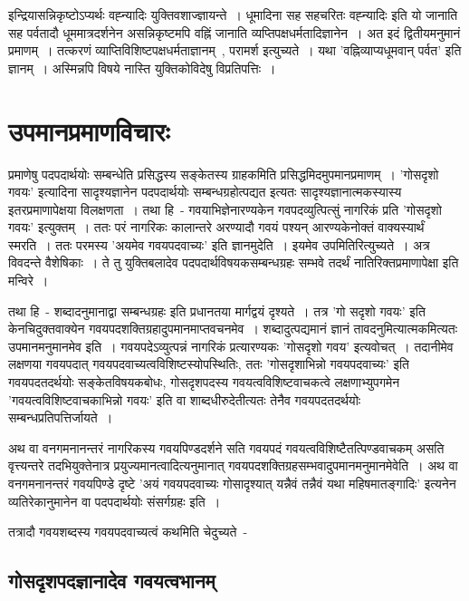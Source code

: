 इन्द्रियासन्निकृष्टोऽप्यर्थः वह्न्यादिः युक्तिवशाज्ज्ञायन्ते~। धूमादिना सह सहचरितः वह्न्यादिः इति यो जानाति सह पर्वतादौ धूममात्रदर्शनेन असन्निकृष्टमपि वह्निं जानाति व्यप्तिपक्षधर्मतादिज्ञानेन~। अत इदं द्वितीयमनुमानं प्रमाणम्~। तत्करणं व्याप्तिविशिष्टपक्षधर्मताज्ञानम्~, परामर्श इत्युच्यते~। यथा 'वह्निव्याप्यधूमवान् पर्वत' इति ज्ञानम्~। अस्मिन्नपि विषये नास्ति युक्तिकोविदेषु विप्रतिपत्तिः~।

	\section{उपमानप्रमाणविचारः}

	प्रमाणेषु पदपदार्थयोः सम्बन्धेति प्रसिद्धस्य सङ्केतस्य ग्राहकमिति प्रसिद्धमिदमुपमानप्रमाणम्~। 'गोसदृशो गवयः' इत्यादिना सादृश्यज्ञानेन पदपदार्थयोः सम्बन्धग्रहोत्पद्यत इत्यतः सादृश्यज्ञानात्मकस्यास्य इतरप्रमाणापेक्षया विलक्षणता~। तथा हि~- गवयाभिज्ञेनारण्यकेन गवपदव्युत्पित्सुं नागरिकं प्रति 'गोसदृशो गवयः' इत्युक्तम्~। ततः परं नागरिकः कालान्तरे अरण्यादौ गवयं पश्यन् आरण्यकेनोक्तं वाक्यस्यार्थं स्मरति~। ततः परमस्य 'अयमेव गवयपदवाच्यः' इति ज्ञानमुदेति~। इयमेव उपमितिरित्युच्यते~। अत्र विवदन्ते वैशेषिकाः~। ते तु  युक्तिबलादेव पदपदार्थविषयकसम्बन्धग्रहः सम्भवे तदर्थं नातिरिक्तप्रमाणापेक्षा इति मन्विरे~।

	तथा हि~- शब्दादनुमानाद्वा सम्बन्धग्रहः इति प्रधानतया मार्गद्वयं दृश्यते~। तत्र 'गो सदृशो गवयः' इति केनचिदुक्तवाक्येन गवयपदशक्तिग्रहादुपमानमाप्तवचनमेव~। शब्दादुत्पद्यमानं ज्ञानं तावदनुमित्यात्मकमित्यतः उपमानमनुमानमेव इति~। गवयपदेऽव्युत्पन्नं नागरिकं प्रत्यारण्यकः 'गोसदृशो गवय' इत्यवोचत्~। तदानीमेव लक्षणया गवयपदात् गवयपदवाच्यत्वविशिष्टस्योपस्थितिः, ततः  'गोसदृशाभिन्नो गवयपदवाच्यः' इति गवयपदतदर्थयोः सङ्केतविषयकबोधः, गोसदृशपदस्य गवयत्वविशिष्टवाचकत्वे लक्षणाभ्युपगमेन 'गवयत्वविशिष्टवाचकाभिन्नो गवयः' इति वा शाब्दधीरुदेतीत्यतः तेनैव गवयपदतदर्थयोः सम्बन्धप्रतिपत्तिर्जायते~।

	अथ वा वनगमनानन्तरं नागरिकस्य गवयपिण्डदर्शने सति गवयपदं गवयत्वविशिष्टैतत्पिण्डवाचकम् असति वृत्त्यन्तरे तदभियुक्तेनात्र प्रयुज्यमानत्वादित्यनुमानात् गवयपदशक्तिग्रहसम्भवादुपमानमनुमानमेवेति~। अथ वा वनगमनानन्तरं गवयपिण्डे दृष्टे 'अयं गवयपदवाच्यः गोसादृश्यात् यन्नैवं तन्नैवं यथा महिषमातङ्गादिः' इत्यनेन व्यतिरेकानुमानेन वा पदपदार्थयोः संसर्गग्रहः इति~।

	तत्रादौ गवयशब्दस्य गवयपदवाच्यत्वं कथमिति चेदुच्यते~-

		\subsection{गोसदृशपदज्ञानादेव गवयत्वभानम्}

